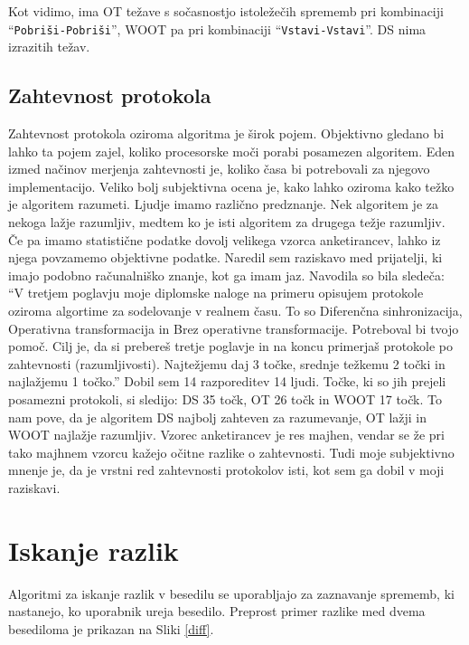 \documentclass[a4paper, 12pt, twoside]{book}
\begin{document}
Kot vidimo, ima OT težave s sočasnostjo istoležečih sprememb pri kombinaciji “{\tt Pobriši-Pobriši}”, WOOT pa pri kombinaciji “{\tt Vstavi-Vstavi}”. DS nima izrazitih težav.

\section{Zahtevnost protokola}

Zahtevnost protokola oziroma algoritma je širok pojem. Objektivno gledano bi lahko ta pojem zajel, koliko procesorske moči porabi posamezen algoritem. Eden izmed načinov merjenja zahtevnosti je, koliko časa bi potrebovali za njegovo implementacijo. Veliko bolj subjektivna ocena je, kako lahko oziroma kako težko je algoritem razumeti. Ljudje imamo različno predznanje. Nek algoritem je za nekoga lažje razumljiv, medtem ko je isti algoritem za drugega težje razumljiv. Če pa imamo statistične podatke dovolj velikega vzorca anketirancev, lahko iz njega povzamemo objektivne podatke. Naredil sem raziskavo med prijatelji, ki imajo podobno računalniško znanje, kot ga imam jaz. Navodila so bila sledeča: “V tretjem poglavju moje diplomske naloge na primeru opisujem protokole oziroma algortime za sodelovanje v realnem času. To so Diferenčna sinhronizacija, Operativna transformacija in Brez operativne transformacije. Potreboval bi tvojo pomoč. Cilj je, da si prebereš tretje poglavje in na koncu primerjaš protokole po zahtevnosti (razumljivosti). Najtežjemu daj 3 točke, srednje težkemu 2 točki in najlažjemu 1 točko.” Dobil sem 14 razporeditev 14 ljudi. Točke, ki so jih prejeli posamezni protokoli, si sledijo: DS 35 točk, OT 26 točk in WOOT 17 točk. To nam pove, da je algoritem DS najbolj zahteven za razumevanje, OT lažji in WOOT najlažje razumljiv. Vzorec anketirancev je res majhen, vendar se že pri tako majhnem vzorcu kažejo očitne razlike o zahtevnosti. Tudi moje subjektivno mnenje je, da je vrstni red zahtevnosti protokolov isti, kot sem ga dobil v moji raziskavi.

\chapter{Iskanje razlik}
\label{chp:diff}

Algoritmi za iskanje razlik v besedilu se uporabljajo za zaznavanje sprememb, ki nastanejo, ko uporabnik ureja besedilo. Preprost primer razlike med dvema besediloma je prikazan na Sliki \ref{diff}.
\end{document}
